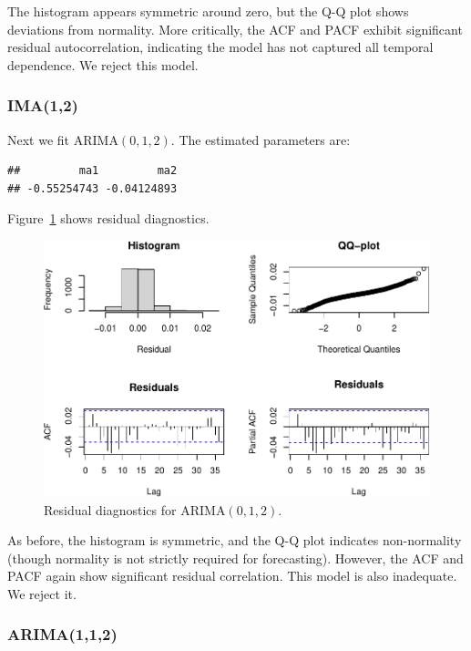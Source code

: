 \documentclass[final,11pt]{article}
\theoremstyle{plain}
\theoremstyle{remark}
\begin{document}
The histogram appears symmetric around zero, but the Q-Q plot shows
deviations from normality. More critically, the ACF and PACF exhibit
significant residual autocorrelation, indicating the model has not captured
all temporal dependence. We reject this model.

\hypertarget{ima12}{%
\subsubsection{IMA(1,2)}\label{ima12}}

Next we fit ARIMA$(0,1,2)$. The estimated parameters are:

\begin{verbatim}
##         ma1         ma2
## -0.55254743 -0.04124893
\end{verbatim}

Figure~\ref{fig:res3} shows residual diagnostics.

\begin{figure}
\includegraphics{paper_files/figure-latex/unnamed-chunk-11-1.pdf}
    \caption{Residual diagnostics for ARIMA$(0,1,2)$.}
    \label{fig:res3}
\end{figure}

As before, the histogram is symmetric, and the Q-Q plot indicates
non-normality (though normality is not strictly required for forecasting).
However, the ACF and PACF again show significant residual correlation.
This model is also inadequate. We reject it.

\hypertarget{arima112}{%
\subsubsection{ARIMA(1,1,2)}\label{arima112}}
\end{document}
